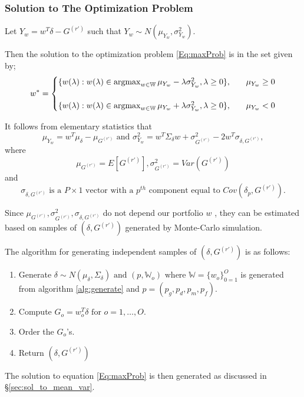 				\subsubsection{Solution to The Optimization Problem}
					\begin{thm} \label{thm:solution_to_opt_prob}
						Let $Y_w = w^T\delta - G^{(r')}$ such that $Y_w \sim N(\mu_{Y_w}, \sigma^2_{Y_w}).$

						Then the solution to the optimization problem \ref{Eq:maxProb} is in the set given by;
						\begin{equation}
							w^* =  {\begin{cases}
								{
									\{ w(\lambda):w(\lambda) \in \operatorname*{argmax}_{w\in \mathbb{W}} \mu_{Y_w} - \lambda \sigma^2_{Y_w}, \lambda \ge0 \}
								}, \quad & \mu_{Y_w} \ge 0  \\\\
								{
									\{ w(\lambda):w(\lambda) \in \operatorname*{argmax}_{w\in \mathbb{W}} \mu_{Y_w} + \lambda \sigma^2_{Y_w}, \lambda \ge0 \}
								}, \quad & \mu_{Y_w} < 0
							\end{cases}}
						\end{equation}

						\begin{prf}
							It follows from elementary statistics that
							\[
							\mu_{Y_w} =  w^T\mu_{\delta} - \mu_{G^{(r')}} \text{ and } \sigma^2_{Y_w} = w^T\Sigma_{\delta}w + \sigma^2_{G^{(r')}} - 2w^T\sigma_{\delta, G^{(r')}},
							\]
							where \[
							\mu_{G^{(r')}} = E[G^{(r')}], \sigma^2_{G^{(r')}} = Var(G^{(r')})\] and \[ \sigma_{\delta, G^{(r')}} \text{ is a } P\times 1 \text{ vector with a } p^{th}\text{ component equal to } Cov(\delta_p, G^{(r')}).
							\]

							Since $\mu_{G^{(r')}}, \sigma^2_{G^{(r')}}, \sigma_{\delta, G^{(r')}}$ do not depend our portfolio $w$ , they can be estimated based on samples of $(\delta, G^{(r')})$ generated by Monte-Carlo simulation.\\

						\end{prf}
					\end{thm}

					\begin{lem}	\cite{bibid}
						The algorithm for generating independent samples of $(\delta, G^{(r')})$ is as follows:
						\begin{enumerate}
							\item Generate $\delta \sim N(\mu_\delta, \Sigma_\delta) \text{ and } (p,\mathbb{W}_o) \text{ where } \mathbb{W} = \{ w_o\}_{0=1}^O$ is generated from algorithm \ref{alg:generate} and $p = (p_g, p_d, p_m, p_f)$.
							\item Compute $G_o = w_o^T\delta \text{ for } o = 1, \dots, O.$
							\item Order the $G_o$'s.
							\item Return $(\delta, G^{(r')})$
						\end{enumerate}
					\end{lem}
					The solution to equation \eqref{Eq:maxProb} is then generated as discussed in \S \ref{sec:sol_to_mean_var}.\\

